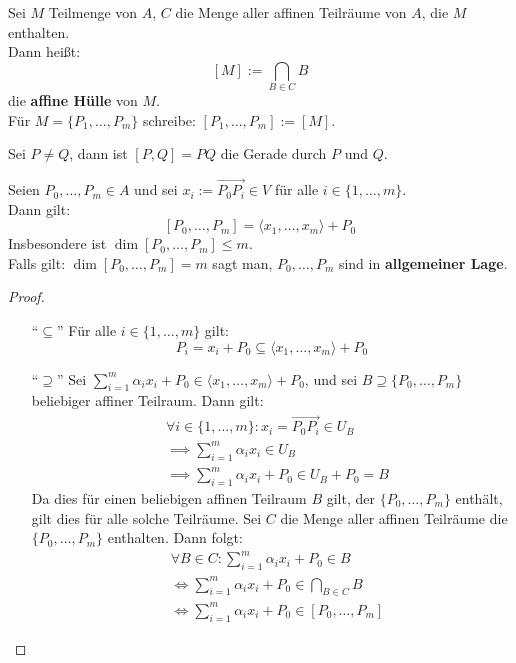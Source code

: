 \documentclass[parskip,a4paper,twoside,DIV15,BCOR12mm]{scrbook}
\begin{document}
\begin{definition}
Sei $M$ Teilmenge von $A$, $C$ die Menge aller affinen Teilräume von $A$, die $M$ enthalten.\\
Dann heißt:
\[[M]:=\bigcap_{B\in C}B\]
die \textbf{affine Hülle} von $M$.\\
Für $M=\{P_1,\ldots,P_m\}$ schreibe: $[P_1,\ldots,P_m]:=[M]$.
\end{definition}

\begin{example}
Sei $P\ne Q$, dann ist $[P,Q]=PQ$ die Gerade durch $P$ und $Q$.
\end{example}

\begin{lemma}
Seien $P_0,\ldots,P_m\in A$ und sei $x_i:=\overrightarrow{P_0P_i}\in V$ für alle $i\in\{1,\ldots,m\}$.\\
Dann gilt:
\[[P_0,\ldots ,P_m]=\langle x_1,\ldots ,x_m \rangle +P_0\]
Insbesondere ist $\dim{[P_0,\ldots,P_m]}\le m$.\\
Falls gilt: $\dim{[P_0,\ldots,P_m]}=m$ sagt man, $P_0,\ldots,P_m$ sind in \textbf{allgemeiner Lage}.
\end{lemma}

\begin{proof}
\begin{enumerate}
\item["`$\subseteq$"'] Für alle $i\in\{1,\ldots,m\}$ gilt:
\[P_i=x_i+P_0\subseteq\langle x_1,\ldots,x_m\rangle+P_0\]
\item["`$\supseteq$"'] Sei $\sum_{i=1}^m{\alpha_i x_i+P_0}\in\langle x_1,\ldots,x_m\rangle+P_0$,
und sei $B\supseteq\{P_0,\ldots,P_m\}$ beliebiger affiner Teilraum. Dann gilt:
\begin{align*}
&\forall i\in\{1,\ldots,m\}: x_i=\overrightarrow{P_0P_i}\in U_B\\
&\implies \sum_{i=1}^m{\alpha_i x_i}\in U_B\\
&\implies \sum_{i=1}^m{\alpha_i x_i+P_0}\in U_B+P_0=B
\end{align*}
Da dies für einen beliebigen affinen Teilraum $B$ gilt, der $\{P_0,\ldots,P_m\}$ enthält, gilt dies für alle
solche Teilräume. Sei $C$ die Menge aller affinen Teilräume die $\{P_0,\ldots,P_m\}$ enthalten. Dann folgt:
\begin{align*}
&\forall B\in C: \sum_{i=1}^m{\alpha_i x_i+P_0}\in B\\ 
&\iff \sum_{i=1}^m{\alpha_i x_i+P_0}\in\bigcap_{B\in C}B\\
&\iff \sum_{i=1}^m{\alpha_i x_i+P_0}\in[P_0,\ldots,P_m]
\end{align*}
\end{enumerate}
\end{proof}
\end{document}
